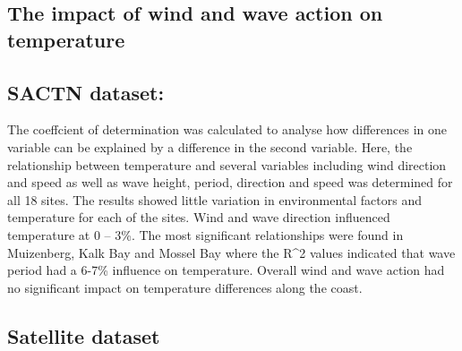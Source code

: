 \documentclass[12pt,A4paper,]{article}
\begin{document}
\subsection{The impact of wind and wave action on
temperature}\label{the-impact-of-wind-and-wave-action-on-temperature}

\subsection{SACTN dataset:}\label{sactn-dataset}

The coeffcient of determination was calculated to analyse how
differences in one variable can be explained by a difference in the
second variable. Here, the relationship between temperature and several
variables including wind direction and speed as well as wave height,
period, direction and speed was determined for all 18 sites. The results
showed little variation in environmental factors and temperature for
each of the sites. Wind and wave direction influenced temperature at 0
-- 3\%. The most significant relationships were found in Muizenberg,
Kalk Bay and Mossel Bay where the R\^{}2 values indicated that wave
period had a 6-7\% influence on temperature. Overall wind and wave
action had no significant impact on temperature differences along the
coast.

\subsection{Satellite dataset}\label{satellite-dataset}
\end{document}
